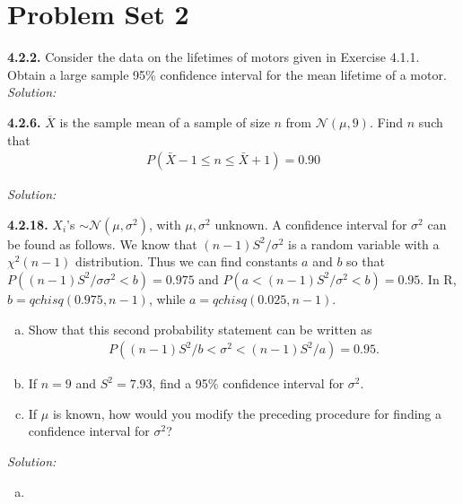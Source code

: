 \documentclass{book}
\theoremstyle{definition}
\newcommand{\N}{\mathcal{N}}
\begin{document}
\newpage

\section{Problem Set 2}




\noindent \textbf{4.2.2.} Consider the data on the lifetimes of motors given in Exercise 4.1.1. Obtain
a large sample 95\% confidence interval for the mean lifetime of a motor.\\

\noindent \textit{Solution:} 




\newpage
\noindent\textbf{4.2.6.} $\overline{X}$ is the sample mean of a sample of size $n$ from $\N(\mu,9)$. Find $n$ such that 
\begin{align}
P(\bar{X}-1\leq n \leq \bar{X}+1) = 0.90
\end{align}

\noindent \textit{Solution:} 



\newpage
\noindent\textbf{4.2.18.} $X_i$'s $\sim \N(\mu,\sigma^2)$, with $\mu,\sigma^2$ unknown. A confidence interval for $\sigma^2$ can be found as follows.
We know that $(n−1)S^2/\sigma^2$ is a random variable with a $\chi^2(n−1)$ distribution. Thus
we can find constants $a$ and $b$ so that $P((n − 1)S^2/σ\sigma^2 < b)=0.975$ and $P(a <
(n − 1)S^2/\sigma^2 < b)=0.95$. In R, $b = qchisq(0.975,n-1)$, while $a = qchisq(0.025,n-1).$


\begin{enumerate}[(a)]
	\item Show that this second probability statement can be written as
	\begin{align}
	P((n − 1)S^2/b < \sigma^2 < (n − 1)S^2/a)=0.95.
	\end{align}
	\item If $n = 9$ and $S^2 = 7.93$, find a 95\% confidence interval for $\sigma^2$.
	\item If $\mu$ is known, how would you modify the preceding procedure for finding a
	confidence interval for $\sigma^2$?
\end{enumerate}


\noindent \textit{Solution:}

\begin{enumerate}[(a)]
	\item 
\end{enumerate}
\end{document}
